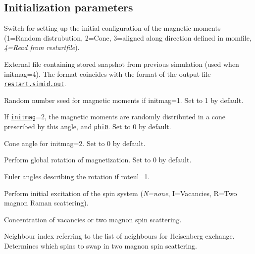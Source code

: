 \documentclass[11pt,fleqn,a4]{book} %
\makeatletter
\newcommand{\litem}[1]{\item[\bfseries#1\index{#1@\texttt{#1}}\label{#1}]}
\newcommand{\rkeyword}[1]{\hyperref[#1]{\texttt{#1}}}
\newcommand{\rfilename}[1]{\hyperref[#1]{\texttt{#1}}}
\makeatother
\begin{document}
\subsection{Initialization parameters}
\begin{description}[leftmargin=!,labelwidth=\widthof{\bfseries fifteenchars}]
\litem{initmag} Switch for setting up the initial configuration of the magnetic moments (1=Random distrubution, 2=Cone, 3=aligned along direction defined in momfile, \emph{4=Read from restartfile}).
\litem{restartfile} External file containing stored snapshot from previous simulation (used when initmag=4). The format coincides with the format of the output file \rfilename{restart.simid.out}.
\litem{mseed} Random number seed for magnetic moments if initmag=1. Set to 1 by default.
\litem{theta0} If \rkeyword{initmag}=2, the magnetic moments are randomly distributed in a cone prescribed by this angle, and \rkeyword{phi0}. Set to 0 by default.
\litem{phi0} Cone angle for initmag=2. Set to 0 by default.
\litem{roteul} Perform global rotation of magnetization. Set to 0 by default.
\litem{rotang} Euler angles describing the rotation if roteul=1.
\litem{initexc} Perform initial excitation of the spin system (\emph{N=none}, I=Vacancies, R=Two magnon Raman scattering).
\litem{initconc} Concentration of vacancies or two magnon spin scattering.
\litem{initneigh} Neighbour index referring to the list of neighbours for Heisenberg exchange. Determines which spins to swap in two magnon spin scattering.
\end{description}

\end{document}
